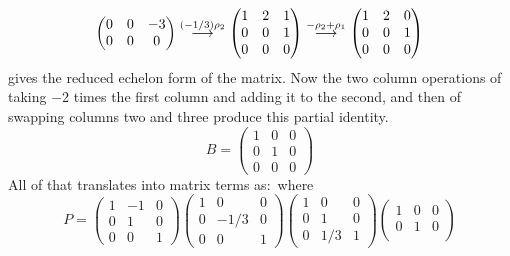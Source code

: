 \begin{exercises}
\begin{answer}
\begin{equation*}
\begin{pmatrix}
          0  &0  &-3 \\
          0  &0  &0
        \end{pmatrix}
        \mathrel{ \mathop{\longrightarrow}\limits^{(-1/3)\rho_2\mathstrut}_{ \begin{subarray}{l} \relax \end{subarray}}}
        \begin{pmatrix}
          1  &2  &1  \\
          0  &0  &1 \\
          0  &0  &0
        \end{pmatrix}
        \mathrel{ \mathop{\longrightarrow}\limits^{-\rho_2+\rho_1\mathstrut}_{ \begin{subarray}{l} \relax \end{subarray}}}
        \begin{pmatrix}
          1  &2  &0  \\
          0  &0  &1 \\
          0  &0  &0
        \end{pmatrix}
      \end{equation*}
      gives the reduced echelon form of the matrix.
      Now the two column operations of taking $-2$ times the first column 
      and adding it to the second, and then of swapping columns two and three
      produce this partial identity. 
      \begin{equation*} 
        B=\begin{pmatrix}
          1  &0  &0  \\
          0  &1  &0  \\ 
          0  &0  &0
        \end{pmatrix}
      \end{equation*}
      All of that translates into matrix terms as:~where
      \begin{equation*}
        P=
        \begin{pmatrix}
          1  &-1    &0  \\
          0  &1     &0  \\
          0  &0     &1         
        \end{pmatrix}
        \begin{pmatrix}
          1  &0    &0  \\
          0  &-1/3 &0  \\
          0  &0    &1
        \end{pmatrix}
        \begin{pmatrix}
          1  &0    &0  \\
          0  &1    &0  \\
          0  &1/3  &1         
        \end{pmatrix}
        \begin{pmatrix}
          1  &0  &0  \\
          0  &1  &0  \\

\end{pmatrix}
\end{equation*}
\end{answer}
\end{exercises}
